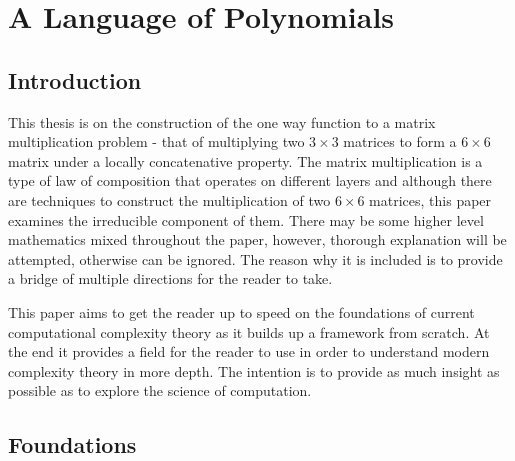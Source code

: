 
\chapter{A Language of Polynomials} %

\label{Chapter1} %


\newcommand{\keyword}[1]{\textbf{#1}}
\newcommand{\tabhead}[1]{\textbf{#1}}
\newcommand{\code}[1]{\texttt{#1}}
\newcommand{\file}[1]{\texttt{\bfseries#1}}
\newcommand{\option}[1]{\texttt{\itshape#1}}


\section{Introduction}

This thesis is on the construction of the one way function to a matrix multiplication problem - that of multiplying two $3 \times 3$ matrices to form a $6 \times 6$ matrix under a locally concatenative property. The matrix multiplication is a type of law of composition that operates on different layers and although there are techniques to construct the multiplication of two $6 \times 6$ matrices, this paper examines the irreducible component of them. There may be some higher level mathematics mixed throughout the paper, however, thorough explanation will be attempted, otherwise can be ignored. The reason why it is included is to provide a bridge of multiple directions for the reader to take.

This paper aims to get the reader up to speed on the foundations of current computational complexity theory as it builds up a framework from scratch. At the end it provides a field for the reader to use in order to understand modern complexity theory in more depth. The intention is to provide as much insight as possible as to explore the science of computation.


\section{Foundations}

